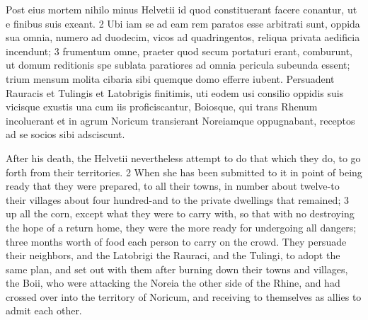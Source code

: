 \documentclass{article}
\begin{document}
\begin{multicols}{2}
Post eius mortem nihilo minus Helvetii id quod constituerant facere conantur, ut e finibus suis exeant. 2 Ubi iam se ad eam rem paratos esse arbitrati sunt, oppida sua omnia, numero ad duodecim, vicos ad quadringentos, reliqua privata aedificia incendunt; 3 frumentum omne, praeter quod secum portaturi erant, comburunt, ut domum reditionis spe sublata paratiores ad omnia pericula subeunda essent; trium mensum molita cibaria sibi quemque domo efferre iubent. Persuadent Rauracis et Tulingis et Latobrigis finitimis, uti eodem usi consilio oppidis suis vicisque exustis una cum iis proficiscantur, Boiosque, qui trans Rhenum incoluerant et in agrum Noricum transierant Noreiamque oppugnabant, receptos ad se socios sibi adsciscunt. 

\vfill\null
\columnbreak
After his death, the Helvetii nevertheless attempt to do that which they do, to go forth from their territories. 2 When she has been submitted to it in point of being ready that they were prepared, to all their towns, in number about twelve-to their villages about four hundred-and to the private dwellings that remained; 3 up all the corn, except what they were to carry with, so that with no destroying the hope of a return home, they were the more ready for undergoing all dangers; three months worth of food each person to carry on the crowd. They persuade their neighbors, and the Latobrigi the Rauraci, and the Tulingi, to adopt the same plan, and set out with them after burning down their towns and villages, the Boii, who were attacking the Noreia the other side of the Rhine, and had crossed over into the territory of Noricum, and receiving to themselves as allies to admit each other.
\end{multicols}
\end{document}
